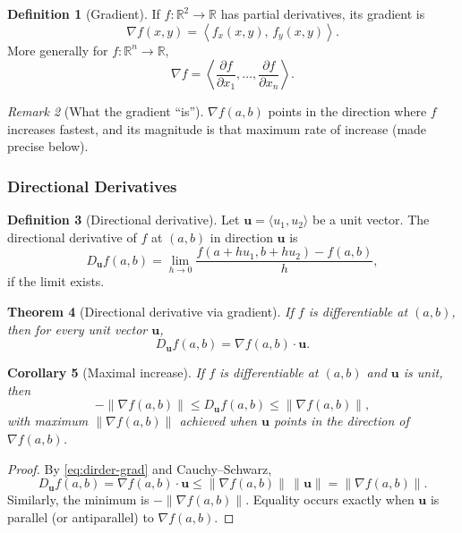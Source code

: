 \documentclass[12pt]{article}
\numberwithin{equation}{section}
\newcommand{\RR}{\mathbb{R}}
\newcommand{\vect}[1]{\boldsymbol{#1}}   %
\newcommand{\norm}[1]{\left\lVert #1\right\rVert}
\theoremstyle{plain}
\newtheorem{theorem}{Theorem}[section]
\newtheorem{corollary}[theorem]{Corollary}
\theoremstyle{definition}
\newtheorem{definition}[theorem]{Definition}
\theoremstyle{remark}
\newtheorem{remark}[theorem]{Remark}
\begin{document}
\begin{definition}[Gradient]\label{def:gradient}
If $f:\RR^2\to\RR$ has partial derivatives, its gradient is
\[
\nabla f(x,y)=\left\langle f_x(x,y),\, f_y(x,y)\right\rangle.
\]
More generally for $f:\RR^n\to\RR$,
\[
\nabla f=\left\langle \frac{\partial f}{\partial x_1},\dots,\frac{\partial f}{\partial x_n}\right\rangle.
\]
\end{definition}

\begin{remark}[What the gradient “is”]
$\nabla f(a,b)$ points in the direction where $f$ increases fastest, and its magnitude is that maximum rate of increase (made precise below).
\end{remark}

\subsubsection{Directional Derivatives}

\begin{definition}[Directional derivative]\label{def:dirder}
Let $\vect u=\langle u_1,u_2\rangle$ be a unit vector. The directional derivative of $f$ at $(a,b)$ in direction $\vect u$ is
\[
D_{\vect u}f(a,b)=\lim_{h\to 0}\frac{f(a+hu_1,b+hu_2)-f(a,b)}{h},
\]
if the limit exists.
\end{definition}

\begin{theorem}[Directional derivative via gradient]\label{thm:dirder-grad}
If $f$ is differentiable at $(a,b)$, then for every unit vector $\vect u$,
\begin{equation}\label{eq:dirder-grad}
D_{\vect u}f(a,b)=\nabla f(a,b)\cdot \vect u.
\end{equation}
\end{theorem}

\begin{corollary}[Maximal increase]\label{cor:max-increase}
If $f$ is differentiable at $(a,b)$ and $\vect u$ is unit, then
\[
-\norm{\nabla f(a,b)} \le D_{\vect u}f(a,b)\le \norm{\nabla f(a,b)},
\]
with maximum $\norm{\nabla f(a,b)}$ achieved when $\vect u$ points in the direction of $\nabla f(a,b)$.
\end{corollary}

\begin{proof}
By \cref{eq:dirder-grad} and Cauchy--Schwarz,
\[
D_{\vect u}f(a,b)=\nabla f(a,b)\cdot \vect u \le \norm{\nabla f(a,b)}\,\norm{\vect u}
=\norm{\nabla f(a,b)}.
\]
Similarly, the minimum is $-\norm{\nabla f(a,b)}$. Equality occurs exactly when $\vect u$ is parallel (or antiparallel) to $\nabla f(a,b)$.
\end{proof}
\end{document}
